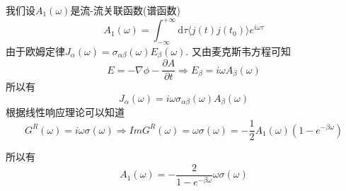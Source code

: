 \documentclass{article}
\numberwithin{equation}{subsection}
\begin{document}
我们设$A_1(\omega)$是流-流关联函数(谱函数)
\begin{equation}
    A_1(\omega)=\int_{-\infty}^{+\infty}\mathrm{d}\tau\langle j(t)j(t_0)\rangle e^{i\omega\tau}
\end{equation}
由于欧姆定律$J_{\alpha}(\omega)=\sigma_{\alpha\beta}(\omega)E_\beta(\omega)$. 又由麦克斯韦方程可知
\begin{equation}
    E=-\nabla\phi-\frac{\partial A}{\partial t}\Longrightarrow E_\beta=i\omega A_\beta(\omega)
\end{equation}
所以有
\begin{equation}
    J_\alpha(\omega)=i\omega\sigma_{\alpha\beta}(\omega)A_\beta(\omega)
\end{equation}
根据线性响应理论可以知道
\begin{equation}
    G^R(\omega)=i\omega\sigma(\omega)\Longrightarrow ImG^R(\omega)=\omega\sigma(\omega)=-\frac{1}{2}A_1(\omega)(1-e^{-\beta\omega})
\end{equation}
\begin{center}
\end{center}
所以有
\begin{equation}
    A_1(\omega)=-\frac{2}{1-e^{-\beta\omega}}\omega\sigma(\omega)
\end{equation}
\end{document}
